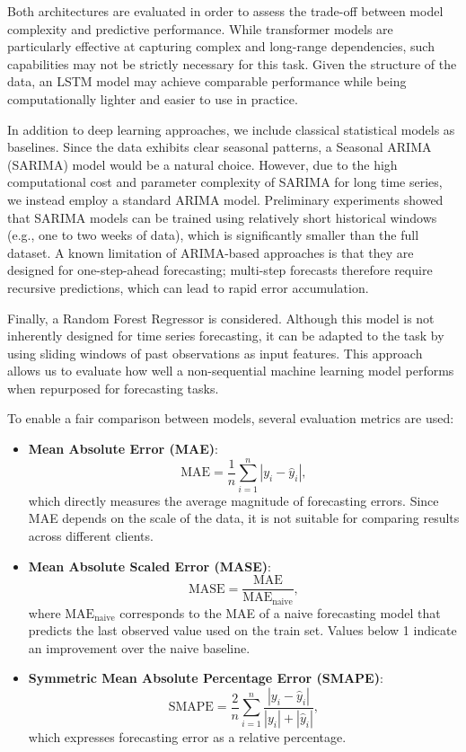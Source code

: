 \par
Both architectures are evaluated in order to assess the trade-off between model complexity and predictive performance. While transformer models are particularly effective at capturing complex and long-range dependencies, such capabilities may not be strictly necessary for this task. Given the structure of the data, an LSTM model may achieve comparable performance while being computationally lighter and easier to use in practice.

\par
In addition to deep learning approaches, we include classical statistical models as baselines. Since the data exhibits clear seasonal patterns, a Seasonal ARIMA (SARIMA) model would be a natural choice. However, due to the high computational cost and parameter complexity of SARIMA for long time series, we instead employ a standard ARIMA model. Preliminary experiments showed that SARIMA models can be trained using relatively short historical windows (e.g., one to two weeks of data), which is significantly smaller than the full dataset. A known limitation of ARIMA-based approaches is that they are designed for one-step-ahead forecasting; multi-step forecasts therefore require recursive predictions, which can lead to rapid error accumulation.

\par
Finally, a Random Forest Regressor is considered. Although this model is not inherently designed for time series forecasting, it can be adapted to the task by using sliding windows of past observations as input features. This approach allows us to evaluate how well a non-sequential machine learning model performs when repurposed for forecasting tasks.

\par
To enable a fair comparison between models, several evaluation metrics are used:
\begin{itemize}
    \item \textbf{Mean Absolute Error (MAE)}:
    \[
    \text{MAE} = \frac{1}{n}\sum_{i=1}^{n} |y_i - \hat{y}_i|,
    \]
    which directly measures the average magnitude of forecasting errors. Since MAE depends on the scale of the data, it is not suitable for comparing results across different clients.
    
    \item \textbf{Mean Absolute Scaled Error (MASE)}:
    \[
    \text{MASE} = \frac{\text{MAE}}{\text{MAE}_{\text{naive}}},
    \]
    where $\text{MAE}_{\text{naive}}$ corresponds to the MAE of a naive forecasting model that predicts the last observed value used on the train set. Values below 1 indicate an improvement over the naive baseline.
    
    \item \textbf{Symmetric Mean Absolute Percentage Error (SMAPE)}:
    \[
    \text{SMAPE} = \frac{2}{n} \sum_{i=1}^{n} \frac{|y_i - \hat{y}_i|}{|y_i| + |\hat{y}_i|},
    \]
    which expresses forecasting error as a relative percentage.
\end{itemize}

